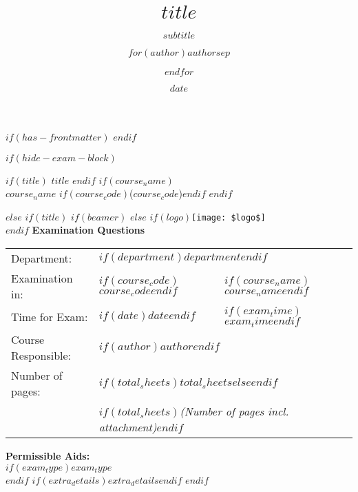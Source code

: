 \documentclass[
$if(fontsize)$$fontsize$,$endif$%
$if(lang)$$babel-lang$,$endif$%
$if(papersize)$$papersize$paper,$endif$%
$for(classoption)$$classoption$$sep$,$endfor$]%
{article}%
\title{$title$}
\subtitle{$subtitle$}
\author{$for(author)$$author$$sep$ \and $endfor$}
\date{$date$}
\begin{document}
$if(has-frontmatter)$
\frontmatter
$endif$

$if(hide-exam-block)$
\begin{center}
  $if(title)$
    \textbf{\Huge $title$}
  $endif$
  $if(course_name)$
    \vspace{12pt}\\
    {\Large $course_name$ $if(course_code)$($course_code$)$endif$}
  $endif$
\end{center}
$else$
$if(title)$
$if(beamer)$
\frame{\titlepage}
$else$
$if(logo)${\centering\texttt{[image: \$logo\$]}\\\vspace{24pt}}$endif$
\doublespacing
\textbf{\Huge Examination Questions}
\vspace{10pt}\\
\begin{tabularx}{\textwidth}{llX}
\toprule
Department: & 
  \multicolumn{2}{l}{$if(department)$\textbf{$department$}$endif$} \\
\cmidrule(r){2-3}
Examination in: & 
  $if(course_code)$\textbf{$course_code$}$endif$& 
  $if(course_name)$\textbf{$course_name$}$endif$\\
\cmidrule(r){2-3}
Time for Exam: & 
  $if(date)$\textbf{$date$}$endif$ & 
  $if(exam_time)$\textbf{$exam_time$}$endif$\\
\cmidrule(r){2-3}
Course Responsible: & \multicolumn{2}{l}{$if(author)$\textbf{$author$}$endif$} \\
\cmidrule(r){2-3}
Number of pages: & \multicolumn{2}{l}{$if(total_sheets)$\textbf{$total_sheets$}$else$\textbf{\pageref{LastPage}}$endif$} \\
& \multicolumn{2}{l}{$if(total_sheets)$\textit{(Number of pages incl. attachment)}$endif$} \\
\bottomrule
\end{tabularx}
\vspace{10pt}
\newline
\textbf{\large Permissible Aids:}\\
$if(exam_type)$\textbf{$exam_type$}\\$endif$
$if(extra_details)$$extra_details$$endif$
$endif$
\end{document}

